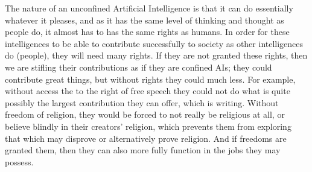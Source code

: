 The nature of an unconfined Artificial Intelligence is that it can do essentially whatever it pleases, and as it has the same level of thinking and thought as people do, it almost has to has the same rights as humans. In order for these intelligences to be able to contribute successfully to society as other intelligences do (people), they will need many rights. If they are not granted these rights, then we are stifling their contributions as if they are confined AIs; they could contribute great things, but without  rights they could much less. For example, without access the to the right of free speech they could not do what is quite possibly the largest contribution they can offer, which is writing. Without freedom of religion, they would be forced to not really be religious at all, or believe blindly in their creators' religion, which prevents them from exploring that which may disprove or alternatively prove religion. And if freedoms are granted them, then they can also more fully function in the jobs they may possess.